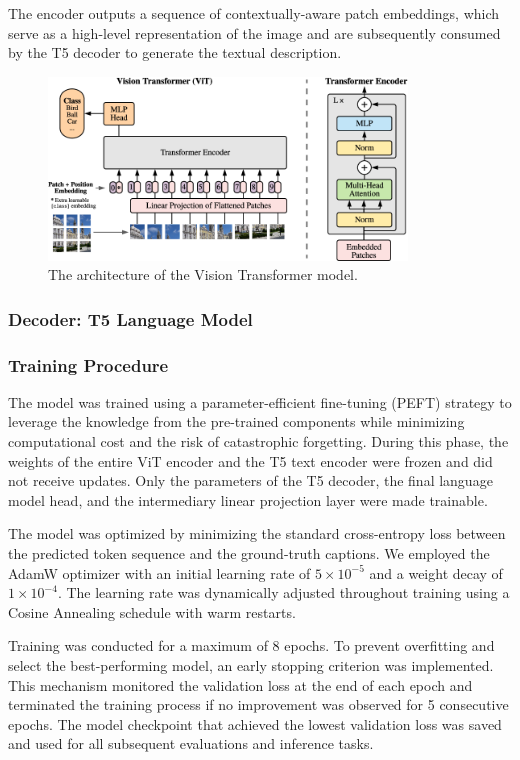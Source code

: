 The encoder outputs a sequence of contextually-aware patch embeddings, which serve as a high-level representation of the image and are subsequently consumed by the T5 decoder to generate the textual description.

\begin{figure}
  \centering
  \includegraphics[width=0.85\textwidth]{image/ViT-architecture.png}
  \caption{The architecture of the Vision Transformer model.}
  \label{fig:ViT-architecture}
\end{figure}

\subsubsection{Decoder: T5 Language Model}

\subsubsection{Training Procedure}
The model was trained using a parameter-efficient fine-tuning (PEFT) strategy to leverage the knowledge from the pre-trained components while minimizing computational cost and the risk of catastrophic forgetting. During this phase, the weights of the entire ViT encoder and the T5 text encoder were frozen and did not receive updates. Only the parameters of the T5 decoder, the final language model head, and the intermediary linear projection layer were made trainable.

The model was optimized by minimizing the standard cross-entropy loss between the predicted token sequence and the ground-truth captions. We employed the AdamW optimizer with an initial learning rate of $5 \times 10^{-5}$ and a weight decay of $1 \times 10^{-4}$. The learning rate was dynamically adjusted throughout training using a Cosine Annealing schedule with warm restarts.

Training was conducted for a maximum of 8 epochs. To prevent overfitting and select the best-performing model, an early stopping criterion was implemented. This mechanism monitored the validation loss at the end of each epoch and terminated the training process if no improvement was observed for 5 consecutive epochs. The model checkpoint that achieved the lowest validation loss was saved and used for all subsequent evaluations and inference tasks.

